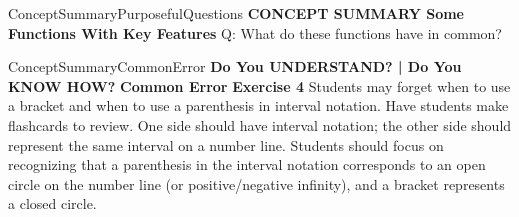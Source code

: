 \documentclass{article}
\newenvironment{te-addendum}[2]{}{}     %
\newcommand{\answer}[1]{}               %
\begin{document}
\begin{te-addendum}{ConceptSummary}{PurposefulQuestions}
\textbf{CONCEPT SUMMARY Some Functions With Key Features}
Q: What do these functions have in common?
\answer{The domain of each of these functions is all real numbers. Each function has a y-intercept.}
\end{te-addendum}
\begin{te-addendum}{ConceptSummary}{CommonError}
\textbf{Do You UNDERSTAND? | Do You KNOW HOW?}
\textbf{Common Error}
\textbf{Exercise 4} Students may forget when to use a bracket and when to use a parenthesis in interval notation. Have students make flashcards to review. One side should have interval notation; the other side should represent the same interval on a number line. Students should focus on recognizing that a parenthesis in the interval notation corresponds to an open circle on the number line (or positive/negative infinity), and a bracket represents a closed circle.
\end{te-addendum}
\end{document}
